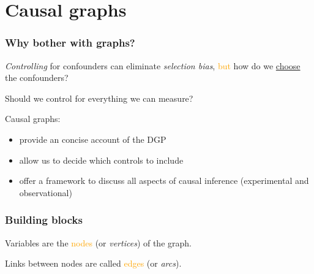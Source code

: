 \documentclass[12pt,english,dvipsnames,aspectratio=169,handout]{beamer}
\begin{document}
\section{Causal graphs}

\begin{frame}
	\frametitle{Why bother with graphs?}
	\textit{Controlling} for confounders can eliminate \textit{selection bias}, \textcolor{orange}{but} how do we \underline{choose} the confounders?\bigskip
	
	Should we control for everything we can measure?\bigskip
	
	\pause
	
	Causal graphs:
	\begin{itemize}
		\item provide an concise account of the DGP
		\item allow us to decide which controls to include
		\item offer a framework to discuss all aspects of causal inference (experimental and observational)
	\end{itemize}
	
\end{frame}


\begin{frame}
	\frametitle{Building blocks}
	Variables are the \textcolor{orange}{nodes} (or \textit{vertices}) of the graph.
	
	\begin{figure}
		\centering
		\scriptsize
	\end{figure}\bigskip

	\pause
	
	Links between nodes are called \textcolor{orange}{edges} (or \textit{arcs}).
	
	\begin{figure}
		\centering
		\scriptsize
	\end{figure}
	
\end{frame}
\end{document}
